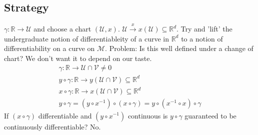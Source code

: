 \documentclass[10pt, oneside]{article}
\newcommand{\R}{\mathbb{R}}
\newcommand{\M}{\mathcal{M}}
\begin{document}
  \subsection*{Strategy}
     $\gamma: \R \to \mathcal{U}$ and choose a chart $(\mathcal{U},x)$. $\mathcal{U} \xrightarrow{x} x(\mathcal{U}) \subseteq \R^d$.
     Try and 'lift' the undergraduate notion of differentiableity of a curve in $\R^d$ to a notion of differentiability on a curve on $\M$.
     Problem: Is this well defined under a change of chart? We don't want it to depend on our taste.
     \begin{align}
        \gamma: \R \to\mathcal{U} \cap \mathcal{V} \neq 0 \\
        y \circ \gamma: \R \to y(\mathcal{U} \cap \mathcal{V}) \subseteq \R^d \\
        x \circ \gamma: \R \to x(\mathcal{U} \cap \mathcal{V}) \subseteq \R^d \\
        y \circ \gamma = (y \circ x^{-1}) \circ (x \circ \gamma) = y \circ (x^{-1} \circ x) \circ \gamma
     \end{align}
     If $(x \circ \gamma)$ differentiable and $(y \circ x^{-1})$ continuous is $y \circ \gamma$ guaranteed to be continuously differentiable? No.
\end{document}
